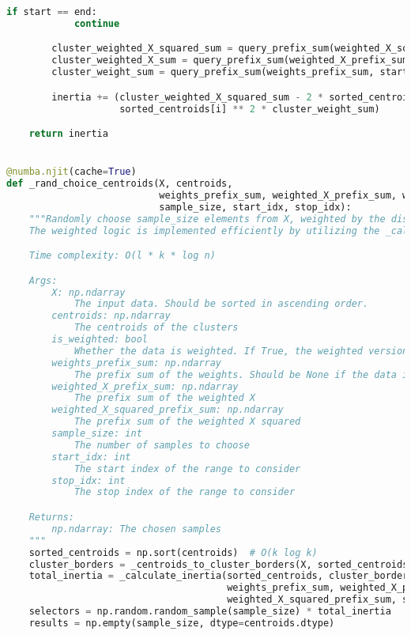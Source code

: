 \begin{lstlisting}[language=Python]
        if start == end:
            continue

        cluster_weighted_X_squared_sum = query_prefix_sum(weighted_X_squared_prefix_sum, start, end)
        cluster_weighted_X_sum = query_prefix_sum(weighted_X_prefix_sum, start, end)
        cluster_weight_sum = query_prefix_sum(weights_prefix_sum, start, end)

        inertia += (cluster_weighted_X_squared_sum - 2 * sorted_centroids[i] * cluster_weighted_X_sum +
                    sorted_centroids[i] ** 2 * cluster_weight_sum)

    return inertia


@numba.njit(cache=True)
def _rand_choice_centroids(X, centroids,
                           weights_prefix_sum, weighted_X_prefix_sum, weighted_X_squared_prefix_sum,
                           sample_size, start_idx, stop_idx):
    """Randomly choose sample_size elements from X, weighted by the distance to the closest centroid.
    The weighted logic is implemented efficiently by utilizing the _calculate_inertia function.

    Time complexity: O(l * k * log n)

    Args:
        X: np.ndarray
            The input data. Should be sorted in ascending order.
        centroids: np.ndarray
            The centroids of the clusters
        is_weighted: bool
            Whether the data is weighted. If True, the weighted versions of the arrays should be provided.
        weights_prefix_sum: np.ndarray
            The prefix sum of the weights. Should be None if the data is unweighted.
        weighted_X_prefix_sum: np.ndarray
            The prefix sum of the weighted X
        weighted_X_squared_prefix_sum: np.ndarray
            The prefix sum of the weighted X squared
        sample_size: int
            The number of samples to choose
        start_idx: int
            The start index of the range to consider
        stop_idx: int
            The stop index of the range to consider

    Returns:
        np.ndarray: The chosen samples
    """
    sorted_centroids = np.sort(centroids)  # O(k log k)
    cluster_borders = _centroids_to_cluster_borders(X, sorted_centroids, start_idx, stop_idx)  # O(k log n)
    total_inertia = _calculate_inertia(sorted_centroids, cluster_borders,  # O(k)
                                       weights_prefix_sum, weighted_X_prefix_sum,
                                       weighted_X_squared_prefix_sum, stop_idx)
    selectors = np.random.random_sample(sample_size) * total_inertia
    results = np.empty(sample_size, dtype=centroids.dtype)


\end{lstlisting}
